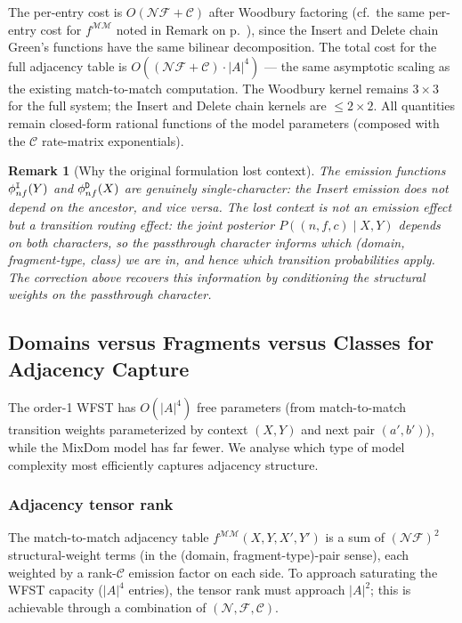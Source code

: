 \documentclass{article}
\newtheorem{remark}{Remark}
\newcommand\dom{n}
\newcommand\ndom{\mathcal{N}}
\newcommand\nfrag{\mathcal{F}}
\newcommand\anctok{a}
\newcommand\destok{b}
\newcommand\alphabet{A}
\newcommand\ins{{\tt I}}
\newcommand\del{{\tt D}}
\newcommand\frag{f}
\newcommand\class{c}
\newcommand\nclasses{\mathcal{C}}
\begin{document}
The per-entry cost is $O(\ndom\nfrag + \nclasses)$ after Woodbury
factoring (cf.\ the same per-entry cost for $f^{\mathcal{M}\mathcal{M}}$
noted in Remark on p.~\pageref{prop:linear}), since the Insert and
Delete chain Green's functions have the same bilinear decomposition.
The total cost for the full adjacency table is
$O((\ndom\nfrag + \nclasses) \cdot |\alphabet|^4)$ --- the same
asymptotic scaling as the existing match-to-match computation.
The Woodbury kernel remains $3 \times 3$ for the full system;
the Insert and Delete chain kernels are $\leq 2 \times 2$.
All quantities remain closed-form rational functions of the model
parameters (composed with the $\nclasses$ rate-matrix exponentials).

\begin{remark}[Why the original formulation lost context]
The emission functions $\phi^{\ins}_{\dom\frag}(Y)$ and
$\phi^{\del}_{\dom\frag}(X)$ are genuinely single-character: the Insert
emission does not depend on the ancestor, and vice versa. The lost
context is not an emission effect but a \emph{transition routing} effect:
the joint posterior $P((\dom,\frag,\class) \mid X, Y)$ depends on both
characters, so the passthrough character informs which
(domain, fragment-type, class) we are in, and hence which transition
probabilities apply. The correction above recovers this information by
conditioning the structural weights on the passthrough character.
\end{remark}


\subsection{Domains versus Fragments versus Classes for Adjacency Capture}
\label{sec:allocation}

The order-1 WFST has $O(|\alphabet|^4)$ free parameters
(from match-to-match transition weights parameterized by context
$(X,Y)$ and next pair $(\anctok',\destok')$), while the MixDom model
has far fewer. We analyse which type of model complexity most
efficiently captures adjacency structure.

\subsubsection{Adjacency tensor rank}

The match-to-match adjacency table $f^{\mathcal{M}\mathcal{M}}(X,Y,X',Y')$
is a sum of $(\ndom\nfrag)^2$ structural-weight terms (in the
(domain, fragment-type)-pair sense), each weighted by a rank-$\nclasses$
emission factor on each side. To approach saturating the WFST capacity
($|\alphabet|^4$ entries), the tensor rank must approach $|\alphabet|^2$;
this is achievable through a combination of $(\ndom, \nfrag, \nclasses)$.
\end{document}
